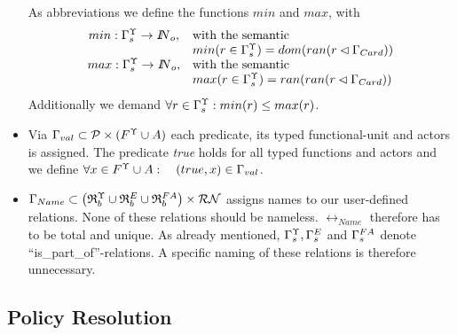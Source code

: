 \begin{itemize}
		As abbreviations we define the functions $min$ and $max$, with
		$$ 
		\begin{array}{cl}
		min: {\Gamma}^{\Upsilon}_{s} \rightarrow { I\!\!N}_{o}, & \mbox{with the semantic} \\ 
		& min(r \in {\Gamma}^{\Upsilon}_{s}) = dom( ran( r \lhd \Gamma_{Card})) \\
		max: {\Gamma}^{\Upsilon}_{s} \rightarrow { I\!\!N}_{o}, & \mbox{with the semantic} \\ 
		& max(r \in {\Gamma}^{\Upsilon}_{s}) = ran( ran ( r \lhd \Gamma_{Card}))
		\end{array}
		$$
		Additionally we demand $\forall r \in {\Gamma}^{\Upsilon}_{s}: min(r) \leq max(r)$.
		
	\item Via $\Gamma_{val} \subset \mathcal{P} \times (F^{\Upsilon} \cup A)$ each predicate, its typed functional-unit and actors is assigned. The predicate {\em true} holds for all typed functions and actors and we define $\forall x \in F^{\Upsilon} \cup A: \quad (true, x) \in \Gamma_{val}$.

	\item $\rel_{Name} \subset \bigl( \typbenutzerrelationenmenge \cup \relmengebenutzerinstOE_F \cup \relmengebenutzerFA \bigr) \times \relname$ 
		assigns names to our user-defined relations. None of these relations should be nameless. $\rel_{Name}$ therefore has to be total and unique. 
		As already mentioned, $\typstrukturrelation, \relstrukturOE_F$ and	${\Gamma}^{FA}_{s}$ denote ``is\_part\_of''-relations. A specific naming of these 		relations is therefore unnecessary. 
\end{itemize}

\subsection{Policy Resolution}\label{PolicyResolutionFormal}

